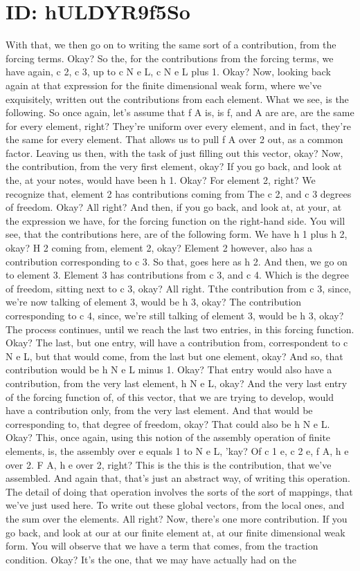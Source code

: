 \documentclass[10pt]{article}
\begin{document}
\section*{ID: hULDYR9f5So}
With that, we then go on to writing the same sort of a contribution, from the forcing terms. Okay? So the, for the contributions from the forcing terms, we have again, c 2, c 3, up to c N e L, c N e L plus 1. Okay? Now, looking back again at that expression for the finite dimensional weak form, where we've exquisitely, written out the contributions from each element. What we see, is the following. So once again, let's assume that f A is, is f, and A are are, are the same for every element, right? They're uniform over every element, and in fact, they're the same for every element. That allows us to pull f A over 2 out, as a common factor. Leaving us then, with the task of just filling out  this vector, okay? Now, the contribution, from the very first element, okay? If you go back, and look at the, at your notes, would have been h 1. Okay? For element 2, right? We recognize that, element 2 has contributions coming from The c 2, and c 3 degrees of freedom. Okay? All right? And then, if you go back, and look at, at your, at the expression we have, for the forcing function on the right-hand side. You will see, that the contributions here, are of the following form. We have h 1 plus h 2, okay? H 2 coming from, element 2, okay? Element 2 however, also has a contribution corresponding to c 3. So that, goes here as h 2. And then, we go on to element 3. Element 3 has contributions from c 3, and c 4. Which is the degree of freedom, sitting next to c 3, okay? All right. Tthe contribution from c 3, since, we're now talking of element 3, would be h 3, okay? The contribution corresponding to c 4, since, we're still talking of element 3, would be h 3, okay? The process continues, until we reach the last two entries, in this forcing function. Okay? The last, but one entry, will have a contribution from, correspondent to c N e L, but that would come, from the last but one element, okay? And so, that contribution would be h N e L minus 1. Okay? That entry would also have a contribution, from the very last element, h N e L, okay? And the very last entry of the forcing function of, of this vector, that we are trying to develop, would have a contribution only, from the very last element. And that would be corresponding to, that degree of freedom, okay? That could also be h N e L. Okay? This, once again, using this notion of the assembly operation of finite elements, is, the assembly over e equals 1 to N e L, 'kay? Of c 1 e, c 2 e, f A, h e over 2. F A, h e over 2, right? This is the this is the contribution, that we've assembled. And again that, that's just an abstract way, of writing this operation. The detail of doing that operation involves the sorts of the sort of mappings, that we've just used here. To write out these global vectors, from the local ones, and the sum over the elements. All right? Now, there's one more contribution. If you go back, and look at our at our finite element at, at our finite dimensional weak form. You will observe that we have a term that comes, from the traction condition. Okay? It's the one, that we may have actually had on the 
\end{document}

